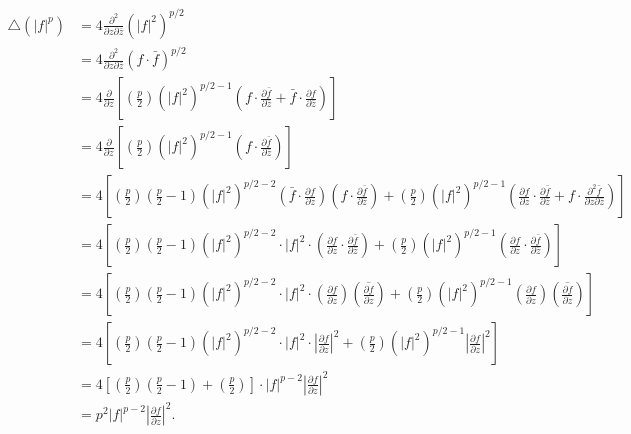\documentclass[12pt]{article}
\begin{document}
\begin{align*}
\triangle(|f|^{p}) & = 4\frac{\partial^{2}}{\partial z\partial \bar{z}}(|f|^{2})^{p/2} \\
& = 4\frac{\partial^{2}}{\partial z\partial \bar{z}}(f\cdot \bar{f})^{p/2} \\
& = 4\frac{\partial}{\partial z}\left[ \left( \frac{p}{2} \right)\left( |f|^{2} \right)^{p/2-1}\left( f
\cdot \frac{\partial\bar{f}}{\partial \bar{z}}  + \bar{f}\cdot \frac{\partial f}{\partial \bar{z}} \right)\right] \\
& = 4\frac{\partial}{\partial z}\left[ \left( \frac{p}{2} \right)\left( |f|^{2} \right)^{p/2-1}\left( f
\cdot \frac{\partial\bar{f}}{\partial \bar{z}}\right)\right] \\
& = 4\left[ \left( \frac{p}{2} \right)\left( \frac{p}{2} - 1 \right)\left( |f|^{2} \right)^{p/2-2}\left( \bar{f}\cdot \frac{\partial f}{\partial z} \right)
\left( f \cdot \frac{\partial \bar{f}}{\partial \bar{z}} \right) + \left( \frac{p}{2}\right)\left( |f|^{2} \right)^{p/2-1} 
\left( \frac{\partial f}{\partial z}\cdot \frac{\partial \bar{f}}{\partial \bar{z}} + f\cdot \frac{\partial^{2}\bar{f}}{\partial z\partial \bar{z}}
 \right)\right] \\
& = 4\left[ \left( \frac{p}{2} \right)\left( \frac{p}{2} - 1 \right)\left( |f|^{2} \right)^{p/2-2}\cdot |f|^{2}\cdot \left( \frac{\partial f}{\partial z}
\cdot \frac{\partial \bar{f}}{\partial \bar{z}} \right) + \left( \frac{p}{2}\right)\left( |f|^{2} \right)^{p/2-1} 
\left( \frac{\partial f}{\partial z}\cdot \frac{\partial \bar{f}}{\partial \bar{z}} \right)\right] \\
& = 4\left[ \left( \frac{p}{2} \right)\left( \frac{p}{2} - 1 \right)\left( |f|^{2} \right)^{p/2-2}\cdot |f|^{2}\cdot \left( \frac{\partial f}{\partial z}
\right)\left(\overline{\frac{\partial f}{\partial z}} \right) + \left( \frac{p}{2}\right)\left( |f|^{2} \right)^{p/2-1} 
\left( \frac{\partial f}{\partial z}\right)\left(\overline{\frac{\partial f}{\partial z}} \right)\right] \\
& = 4\left[ \left( \frac{p}{2} \right)\left( \frac{p}{2} - 1 \right)\left( |f|^{2} \right)^{p/2-2}\cdot |f|^{2}\cdot \left| \frac{\partial f}{\partial z}
\right|^{2} + \left( \frac{p}{2}\right)\left( |f|^{2} \right)^{p/2-1} 
\left| \frac{\partial f}{\partial z}\right|^{2}\right] \\
& = 4\left[ \left( \frac{p}{2} \right)\left( \frac{p}{2} - 1 \right) + \left( \frac{p}{2} \right) \right]\cdot |f|^{p-2}\left| \frac{\partial
f}{\partial z}\right|^{2} \\
& = p^{2}|f|^{p-2}\left| \frac{\partial f}{\partial z}\right|^{2}.
\end{align*}
\end{document}
